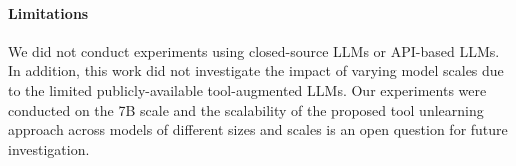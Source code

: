 \paragraph{Limitations}
We did not conduct experiments using closed-source LLMs or API-based LLMs. 
%
In addition, this work did not investigate the impact of varying model scales due to the limited publicly-available tool-augmented LLMs. Our experiments were conducted on the 7B scale and the scalability of the proposed tool unlearning approach across models of different sizes and scales is an open question for future investigation.






